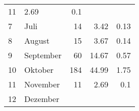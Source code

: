 \begin{longtable}{lXrrr}
       \num{11} &
       \num[round-mode=places,round-precision=2]{2,69} &
         \num[round-mode=places,round-precision=2]{0,1} \\

     7 &
     \multicolumn{1}{X}{ Juli   } &


       \num{14} &
       \num[round-mode=places,round-precision=2]{3,42} &
         \num[round-mode=places,round-precision=2]{0,13} \\

     8 &
     \multicolumn{1}{X}{ August   } &


       \num{15} &
       \num[round-mode=places,round-precision=2]{3,67} &
         \num[round-mode=places,round-precision=2]{0,14} \\

     9 &
     \multicolumn{1}{X}{ September   } &


       \num{60} &
       \num[round-mode=places,round-precision=2]{14,67} &
         \num[round-mode=places,round-precision=2]{0,57} \\

     10 &
     \multicolumn{1}{X}{ Oktober   } &


       \num{184} &
       \num[round-mode=places,round-precision=2]{44,99} &
         \num[round-mode=places,round-precision=2]{1,75} \\

     11 &
     \multicolumn{1}{X}{ November   } &


       \num{11} &
       \num[round-mode=places,round-precision=2]{2,69} &
         \num[round-mode=places,round-precision=2]{0,1} \\

     12 &
     \multicolumn{1}{X}{ Dezember   } &



\end{longtable}
